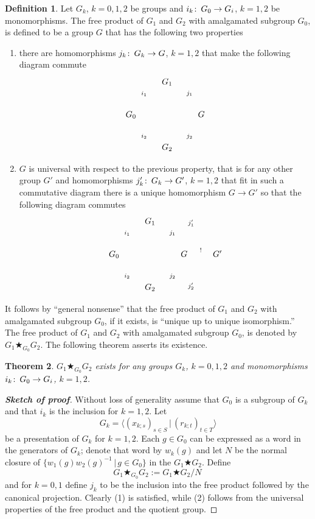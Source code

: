 \documentclass[12pt]{article}
\newtheorem{thm}{Theorem}
\theoremstyle{definition}
\newtheorem{defn}[thm]{Definition}
\theoremstyle{remark}
\numberwithin{equation}{subsection}
\def\co{\colon\thinspace}
\begin{document}

\begin{defn}
Let $G_k$, $k=0,1,2$ be groups and $i_k\co G_0\to G_i$, $k=1,2$  be monomorphisms.
The free product of $G_1$ and $G_2$ with amalgamated subgroup $G_0$,
 is defined to be a group $G$ that has the following 
 two properties
 \begin{enumerate}
 \item there are homomorphisms $j_k\co G_k\to G$,  $k=1,2$ that make the following
 diagram commute
$$\xymatrix{
&{G_1}\ar[dr]^{j_1}&\\
{G_0}\ar[ur]^{i_1}\ar[dr]_{i_2} & & {G}\\
&{G_2}\ar[ur]_{j_2}& 
}
$$
\item $G$  is universal with respect to the previous  property, that is for
  any other group $G'$ and  homomorphisms $j_k'\co G_k\to G'$,  $k=1,2$ that
  fit in such a commutative diagram there is a unique homomorphism $G\to G'$
so that the following diagram commutes
   $$\xymatrix{
&{G_1}\ar[dr]^{j_1}\ar@/^1pc/[drr]^{j_1'}& &\\
{G_0}\ar[ur]^{i_1}\ar[dr]_{i_2} & & {G}\ar[r]^{!}&{G'}\\
&{G_2}\ar[ur]_{j_2}\ar@/_1pc/[urr]_{j_2'}& &
}
$$
 \end{enumerate}
\end{defn}

It follows by ``general nonsense'' that the  free product 
of $G_1$ and $G_2$ with amalgamated subgroup $G_0$, if it exists,
is ``unique up to unique isomorphism.''  The  free product 
of $G_1$ and $G_2$ with amalgamated subgroup $G_0$, is denoted 
by $G_1\bigstar_{G_0} G_2$. The following theorem asserts its existence.

\begin{thm}
$G_1\bigstar_{G_0} G_2$ exists for any groups $G_k$, $k=0,1,2$  and
  monomorphisms $i_k\co G_0\to G_i$,
 $k=1,2$.
 \end{thm}

 \begin{proof}[\textbf{Sketch of proof}]
   Without loss of generality assume that $G_0$ is a subgroup of $G_k$ and
that $i_k$ is the inclusion for $k=1,2$. Let 
$$G_k=\langle (x_{k;s})_{s\in S}\, |\, (r_{k;t})_{t\in T} \rangle$$
be a presentation of $G_k$ for $k=1,2$.  Each $g\in G_0$ can be expressed as
a word in the generators of $G_k$; denote that word by $w_k(g)$ and let
$N$ be the normal closure of $\{w_1(g)w_2(g)^{-1}\,|\,g\in G_0\}$ in the  $G_1\bigstar G_2$. Define 
   $$G_1\bigstar_{G_0} G_2:=G_1\bigstar G_2/N\,$$
and for $k=0,1$ define $j_k$ to be the inclusion into the free product
followed by the canonical projection. Clearly (1) is satisfied, while (2)
follows from the universal properties of the free product and the quotient group. 
 \end{proof}
\end{document}
